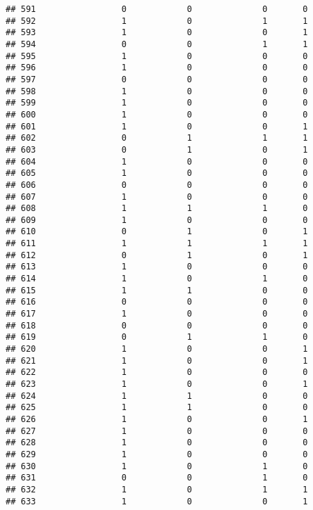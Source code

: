 \documentclass[]{article}
\begin{document}
\begin{verbatim}
## 591                 0            0              0       0
## 592                 1            0              1       1
## 593                 1            0              0       1
## 594                 0            0              1       1
## 595                 1            0              0       0
## 596                 1            0              0       0
## 597                 0            0              0       0
## 598                 1            0              0       0
## 599                 1            0              0       0
## 600                 1            0              0       0
## 601                 1            0              0       1
## 602                 0            1              1       1
## 603                 0            1              0       1
## 604                 1            0              0       0
## 605                 1            0              0       0
## 606                 0            0              0       0
## 607                 1            0              0       0
## 608                 1            1              1       0
## 609                 1            0              0       0
## 610                 0            1              0       1
## 611                 1            1              1       1
## 612                 0            1              0       1
## 613                 1            0              0       0
## 614                 1            0              1       0
## 615                 1            1              0       0
## 616                 0            0              0       0
## 617                 1            0              0       0
## 618                 0            0              0       0
## 619                 0            1              1       0
## 620                 1            0              0       1
## 621                 1            0              0       1
## 622                 1            0              0       0
## 623                 1            0              0       1
## 624                 1            1              0       0
## 625                 1            1              0       0
## 626                 1            0              0       1
## 627                 1            0              0       0
## 628                 1            0              0       0
## 629                 1            0              0       0
## 630                 1            0              1       0
## 631                 0            0              1       0
## 632                 1            0              1       1
## 633                 1            0              0       1

\end{verbatim}
\end{document}
